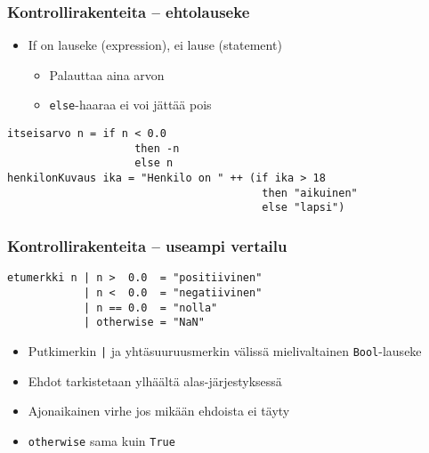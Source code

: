 \documentclass{beamer}
\begin{document}
\begin{frame}[fragile]
\frametitle{Kontrollirakenteita -- ehtolauseke}
\begin{itemize}
\item{If on lauseke (expression), ei lause (statement)}
\begin{itemize}
\item{Palauttaa aina arvon}
\item{\texttt{else}-haaraa ei voi jättää pois}
\end{itemize}
\end{itemize}

\begin{verbatim}
itseisarvo n = if n < 0.0
                    then -n
                    else n
henkilonKuvaus ika = "Henkilo on " ++ (if ika > 18
                                        then "aikuinen"
                                        else "lapsi")
\end{verbatim}

\end{frame}

\begin{frame}[fragile]
\frametitle{Kontrollirakenteita -- useampi vertailu}
\begin{verbatim}
etumerkki n | n >  0.0  = "positiivinen"
            | n <  0.0  = "negatiivinen"
            | n == 0.0  = "nolla"
            | otherwise = "NaN"
\end{verbatim}
\begin{itemize}
\item{Putkimerkin \texttt{|} ja yhtäsuuruusmerkin välissä mielivaltainen \texttt{Bool}-lauseke}
\item{Ehdot tarkistetaan ylhäältä alas-järjestyksessä}
\item{Ajonaikainen virhe jos mikään ehdoista ei täyty}
\item{\texttt{otherwise} sama kuin \texttt{True}}
\end{itemize}
\end{frame}
\end{document}
